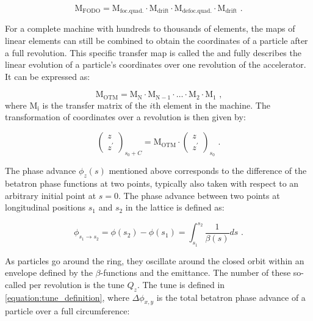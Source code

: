 \begin{equation}
    \mathrm{M_{FODO}} = \mathrm{M_{foc. quad.}} \cdot \mathrm{M_{drift}} \cdot \mathrm{M_{defoc. quad.}} \cdot \mathrm{M_{drift}} \text{ .}
    \label{equation:fodo_transfer_matrix}
\end{equation}

For a complete machine with hundreds to thousands of elements, the maps of linear elements can still be combined to obtain the coordinates of a particle after a full revolution.
This specific transfer map is called the  and fully describes the linear evolution of a particle's coordinates over one revolution of the accelerator.
It can be expressed as:

\begin{equation}
    \mathrm{M_{OTM}} = \mathrm{M_N} \cdot \mathrm{M_{N-1}} \cdot \ldots \cdot \mathrm{M_2} \cdot \mathrm{M_1} \text{ ,}
    \label{equation:one_turn_map}
\end{equation}
where \(\mathrm{M_i}\) is the transfer matrix of the \(i\)th element in the machine.
The transformation of coordinates over a revolution is then given by:

\begin{equation}
    \left(
        \begin{array}{c}
            z \\
            z^{\prime}
        \end{array} \right)_{s_0 + C} = \mathrm{M_{OTM}} \cdot \left( 
        \begin{array}{c}
            z \\
            z^{\prime}
    \end{array} \right)_{s_0} \text{ .}
    \label{equation:one_turn_coordinates_transformation}
\end{equation}

The phase advance \(\phi_z(s)\) mentioned above corresponds to the difference of the betatron phase functions at two points, typically also taken with respect to an arbitrary initial point at \(s = 0\).
The phase advance between two points at longitudinal positions \(s_1\) and \(s_2\) in the lattice is defined as:

\begin{equation}
    \phi_{s_1 \rightarrow s_2} = \phi(s_{2}) - \phi(s_{1}) = \int_{s_{1}}^{s_{2}} \frac{1}{\beta(s)} ds \text{ .}
    \label{equation:phase_advance_definition}
\end{equation}

As particles go around the ring, they oscillate around the closed orbit within an envelope defined by the \(\beta\)-functions and the emittance.
The number of these so-called  per revolution is the \gls{tune} \(Q_z\).
The tune is defined in \cref{equation:tune_definition}, where \(\Delta \phi_{x, y}\) is the total betatron phase advance of a particle over a full circumference:

